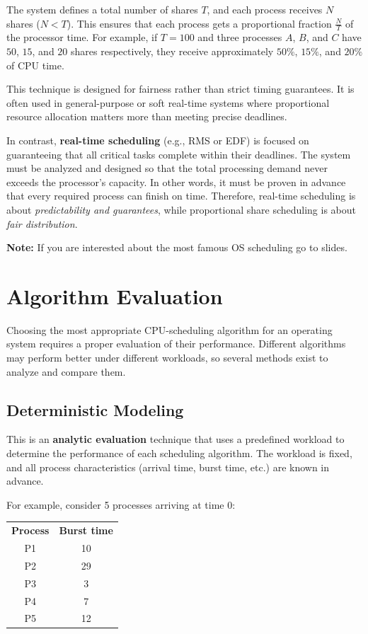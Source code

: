 The system defines a total number of shares $T$, and each process receives $N$ shares ($N < T$). This ensures that each process gets a proportional fraction $\frac{N}{T}$ of the processor time. For example, if $T = 100$ and three processes $A$, $B$, and $C$ have $50$, $15$, and $20$ shares respectively, they receive approximately $50\%$, $15\%$, and $20\%$ of CPU time.

This technique is designed for fairness rather than strict timing guarantees. It is often used in general-purpose or soft real-time systems where proportional resource allocation matters more than meeting precise deadlines.

In contrast, \textbf{real-time scheduling} (e.g., RMS or EDF) is focused on guaranteeing that all critical tasks complete within their deadlines. The system must be analyzed and designed so that the total processing demand never exceeds the processor’s capacity. In other words, it must be proven in advance that every required process can finish on time. Therefore, real-time scheduling is about \textit{predictability and guarantees}, while proportional share scheduling is about \textit{fair distribution}.

\textbf{Note:} If you are interested about the most famous OS scheduling go to slides.

\section{Algorithm Evaluation}

Choosing the most appropriate CPU-scheduling algorithm for an operating system requires a proper evaluation of their performance. Different algorithms may perform better under different workloads, so several methods exist to analyze and compare them.

\subsection{Deterministic Modeling}

This is an \textbf{analytic evaluation} technique that uses a predefined workload to determine the performance of each scheduling algorithm. The workload is fixed, and all process characteristics (arrival time, burst time, etc.) are known in advance.

For example, consider 5 processes arriving at time 0:

\begin{center}
\begin{tabular}{c c}
\textbf{Process} & \textbf{Burst time} \\
P1 & 10 \\
P2 & 29 \\
P3 & 3 \\
P4 & 7 \\
P5 & 12 \\
\end{tabular}
\end{center}

